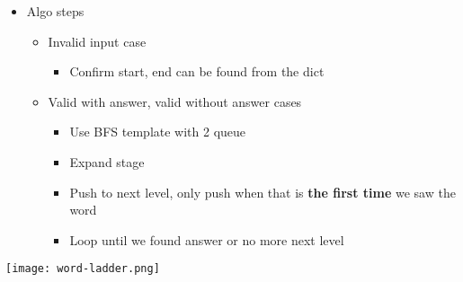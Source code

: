 \begin{itemize}
\begin{itemize}
\begin{itemize}
    \end{itemize}
  \end{itemize}
  \item Algo steps
  \begin{itemize}
    \item Invalid input case
    \begin{itemize}
      \item Confirm start, end can be found from the dict
    \end{itemize}
    \item Valid with answer, valid without answer cases
    \begin{itemize}
      \item Use BFS template with 2 queue
      \item Expand stage
      \item Push to next level, only push when that is \textbf{the first time} we saw the word
      \item Loop until we found answer or no more next level
    \end{itemize}
  \end{itemize}
\end{itemize}

\begin{center}
\texttt{[image: word-ladder.png]}\\
\label{fig:word-ladder}
\end{center}


